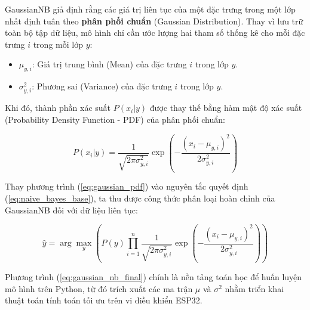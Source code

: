 GaussianNB giả định rằng các giá trị liên tục của một đặc trưng trong một lớp nhất định tuân theo \textbf{phân phối chuẩn} (Gaussian Distribution). Thay vì lưu trữ toàn bộ tập dữ liệu, mô hình chỉ cần ước lượng hai tham số thống kê cho mỗi đặc trưng $i$ trong mỗi lớp $y$:
\begin{itemize}
    \item $\mu_{y,i}$: Giá trị trung bình (Mean) của đặc trưng $i$ trong lớp $y$.
    \item $\sigma_{y,i}^2$: Phương sai (Variance) của đặc trưng $i$ trong lớp $y$.
\end{itemize}

Khi đó, thành phần xác suất $P(x_i|y)$ được thay thế bằng hàm mật độ xác suất (Probability Density Function - PDF) của phân phối chuẩn:

\begin{equation}
P(x_i|y) = \frac{1}{\sqrt{2\pi\sigma_{y,i}^2}} \exp\left(-\frac{(x_i - \mu_{y,i})^2}{2\sigma_{y,i}^2}\right)
\label{eq:gaussian_pdf}
\end{equation}

Thay phương trình (\ref{eq:gaussian_pdf}) vào nguyên tắc quyết định (\ref{eq:naive_bayes_base}), ta thu được công thức phân loại hoàn chỉnh của GaussianNB đối với dữ liệu liên tục:

\begin{equation}
\hat{y} = \arg\max_{y} \left( P(y) \prod_{i=1}^{n} \frac{1}{\sqrt{2\pi\sigma_{y,i}^2}} \exp\left(-\frac{(x_i - \mu_{y,i})^2}{2\sigma_{y,i}^2}\right) \right)
\label{eq:gaussian_nb_final}
\end{equation}

Phương trình (\ref{eq:gaussian_nb_final}) chính là nền tảng toán học để huấn luyện mô hình trên Python, từ đó trích xuất các ma trận $\mu$ và $\sigma^2$ nhằm triển khai thuật toán tính toán tối ưu trên vi điều khiển ESP32.



